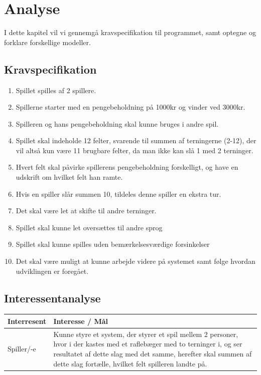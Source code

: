 \chapter{Analyse}

I dette kapitel vil vi gennemgå kravspecifikation til programmet, samt optegne og forklare forskellige modeller.


\section{Kravspecifikation}
\label{sec:requirements}

\begin{enumerate}
    \item Spillet spilles af 2 spillere.
    \item Spillerne starter med en pengebeholdning på 1000kr og vinder ved 3000kr.
    \item Spilleren og hans pengebeholdning skal kunne bruges i andre spil.
    \item Spillet skal indeholde 12 felter, svarende til summen af terningerne (2-12), der vil altså kun være 11 brugbare felter, da man ikke kan slå 1 med 2 terninger.
    \item Hvert felt skal påvirke spillerens pengebeholdning forskelligt, og have en udskrift om hvilket felt han ramte.
    \item Hvis en spiller slår summen 10, tildeles denne spiller en ekstra tur.
    \item Det skal være let at skifte til andre terninger.
    \item Spillet skal kunne let oversættes til andre sprog
    \item Spillet skal kunne spilles uden bemærkelsesværdige forsinkelser
    \item Det skal være muligt at kunne arbejde videre på systemet samt følge hvordan udviklingen er foregået.
    \\
\end{enumerate}

\pagebreak



\section{Interessentanalyse}
\begin{center}
    \begin{tabular}{ | l | p{13cm} |}
    \hline
    \textbf{Interresent} & \textbf{Interesse / Mål} \\ \hline
    Spiller/-e & Kunne styre et system, der styrer et spil mellem 2 personer, 
    hvor i der kastes med et raflebæger med to terninger i, og ser resultatet af dette slag med det samme, herefter skal summen af dette slag fortælle, hvilket felt spilleren landte på.\\ \hline
    \hline
    \end{tabular}
\end{center}

